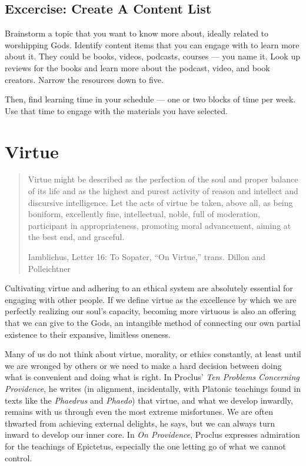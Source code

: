 \documentclass[
]{book}
\begin{document}
\hypertarget{excercise-create-a-content-list}{%
\section{Excercise: Create A Content List}\label{excercise-create-a-content-list}}

Brainstorm a topic that you want to know more about, ideally related to worshipping Gods. Identify content items that you can engage with to learn more about it. They could be books, videos, podcasts, courses --- you name it. Look up reviews for the books and learn more about the podcast, video, and book creators. Narrow the resources down to five.

Then, find learning time in your schedule --- one or two blocks of time per week. Use that time to engage with the materials you have selected.

\hypertarget{virtue}{%
\chapter{Virtue}\label{virtue}}

\begin{quote}
Virtue might be described as the perfection of the soul and proper balance of its life and as the highest and purest activity of reason and intellect and discursive intelligence. Let the acts of virtue be taken, above all, as being boniform, excellently fine, intellectual, noble, full of moderation, participant in appropriateness, promoting moral advancement, aiming at the best end, and graceful.

Iamblichus, Letter 16: To Sopater, ``On Virtue,'' trans. Dillon and Polleichtner
\end{quote}

Cultivating virtue and adhering to an ethical system are absolutely essential for engaging with other people. If we define virtue as the excellence by which we are perfectly realizing our soul's capacity, becoming more virtuous is also an offering that we can give to the Gods, an intangible method of connecting our own partial existence to their expansive, limitless oneness.

Many of us do not think about virtue, morality, or ethics constantly, at least until we are wronged by others or we need to make a hard decision between doing what is convenient and doing what is right. In Proclus' \emph{Ten Problems Concerning Providence}, he writes (in alignment, incidentally, with Platonic teachings found in texts like the \emph{Phaedrus} and \emph{Phaedo}) that virtue, and what we develop inwardly, remains with us through even the most extreme misfortunes. We are often thwarted from achieving external delights, he says, but we can always turn inward to develop our inner core. In \emph{On Providence}, Proclus expresses admiration for the teachings of Epictetus, especially the one letting go of what we cannot control.
\end{document}
